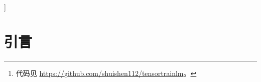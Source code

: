 \documentclass{article}
\theoremstyle{plain}
\theoremstyle{definition}
\theoremstyle{remark}
\begin{document}


\vskip 0.3in
]




\printAffiliationsAndNotice{\icmlEqualContribution} %

\begin{abstract}
我们提出了一种基于最简单张量网络（即张量列（TT））的新型张量网络语言模型，称为「张量列语言模型」（Tensor Train Language Model, TTLM）。TTLM 在由词的张量积构成的指数空间中表示句子，却以低维方式计算句子的概率。我们证明，二阶 RNN、循环算术线路（Recurrent Arithmetic Circuit, RAC）与乘性集成 RNN 的架构本质上都是 TTLM 的特例。在真实语言建模任务上的实验评估表明，所提出的 TTLM 变体（即 TTLM-Large 与 TTLM-Tiny）在隐藏单元数较少时优于朴素循环神经网络（RNN）。\footnote{代码见 \url{https://github.com/shuishen112/tensortrainlm}。}
\end{abstract}

\section{引言}

\end{document}
